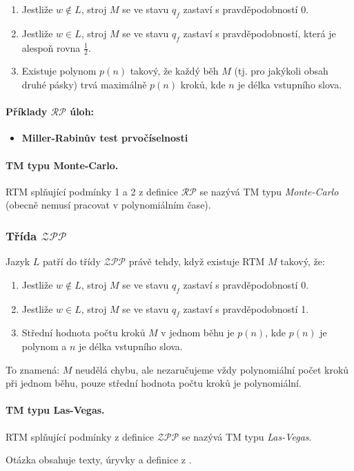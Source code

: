 \begin{enumerate}
    \item Jestliže $w \notin L$, stroj $M$ se ve stavu $q_f$ zastaví s pravděpodobností 0.
    \item Jestliže $w \in L$, stroj $M$ se ve stavu $q_f$ zastaví s pravděpodobností, která je alespoň rovna $\frac{1}{2}$.
    \item Existuje polynom $p(n)$ takový, že každý běh $M$ (tj. pro jakýkoli obsah druhé pásky) trvá maximálně $p(n)$ kroků, kde $n$ je délka vstupního slova.
\end{enumerate}

\paragraph{Příklady $\mathcal{RP}$ úloh:}
\begin{itemize}[itemsep=0pt]
    \item \textbf{\color{darkBrown}Miller-Rabinův test prvočíselnosti}
\end{itemize}

\paragraph{TM typu Monte-Carlo.} RTM splňující podmínky 1 a 2 z definice $\mathcal{RP}$ se nazývá TM typu \textit{Monte-Carlo} (obecně nemusí pracovat v polynomiálním čase).

\subsubsection{Třída $\mathcal{ZPP}$} Jazyk $L$ patří do třídy $\mathcal{ZPP}$ právě tehdy, když existuje RTM $M$ takový, že:

\begin{enumerate}
    \item Jestliže $w \notin L$, stroj $M$ se ve stavu $q_f$ zastaví s pravděpodobností 0.
    \item Jestliže $w \in L$, stroj $M$ se ve stavu $q_f$ zastaví s pravděpodobností 1.
    \item Střední hodnota počtu kroků $M$ v jednom běhu je $p(n)$, kde $p(n)$ je polynom a $n$ je délka vstupního slova.
\end{enumerate}

To znamená: $M$ neudělá chybu, ale nezaručujeme vždy polynomiální počet kroků při jednom běhu, pouze střední hodnota počtu kroků je polynomiální.

\paragraph{TM typu Las-Vegas.} RTM splňující podmínky z definice $\mathcal{ZPP}$ se nazývá TM typu \textit{Las-Vegas}.

Otázka obsahuje texty, úryvky a definice z \cite{tal:demlova}.
